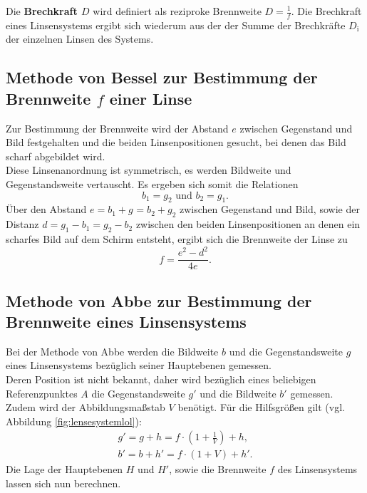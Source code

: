 Die \textbf{Brechkraft $D$} wird definiert als reziproke Brennweite $D=\frac{1}{f}$. Die Brechkraft eines Linsensystems ergibt sich wiederum aus der der Summe der Brechkräfte $D_{\mathrm{i}}$ der einzelnen Linsen des Systems.
\FloatBarrier
\subsection{Methode von Bessel zur Bestimmung der Brennweite $f$ einer Linse}
Zur Bestimmung der Brennweite wird der Abstand $e$ zwischen Gegenstand und Bild festgehalten und die beiden Linsenpositionen gesucht, bei denen das Bild scharf abgebildet wird.\\
Diese Linsenanordnung ist symmetrisch, es werden Bildweite und Gegenstandsweite vertauscht.
Es ergeben sich somit die Relationen
\begin{equation*}
b_{\mathrm{1}}=g_{\mathrm{2}} \text{ und } b_{\mathrm{2}}=g_{\mathrm{1}} \text{.}
\end{equation*}
Über den Abstand $e=b_{\mathrm{1}}+g_{\mathrm{}}=b_{\mathrm{2}}+g_{\mathrm{2}} $ zwischen Gegenstand und Bild, sowie der Distanz $d=g_{\mathrm{1}}-b_{\mathrm{1}}=g_{\mathrm{2}}-b_{\mathrm{2}}$ zwischen den beiden Linsenpositionen an denen ein scharfes Bild auf dem Schirm entsteht,
ergibt sich die Brennweite der Linse zu
\begin{equation}
  \label{eqn:nochmalbessel}
  f=\frac{e^2-d^2}{4e}\text{.}
\end{equation}

\subsection{Methode von Abbe zur Bestimmung der Brennweite eines Linsensystems}
Bei der Methode von Abbe werden die Bildweite $b$ und die Gegenstandsweite $g$ eines Linsensystems bezüglich seiner Hauptebenen gemessen.
\\Deren Position ist nicht bekannt, daher wird bezüglich eines beliebigen Referenzpunktes $A$ die Gegenstandsweite $g'$ und die Bildweite $b'$ gemessen.
\\Zudem wird der Abbildungsmaßstab $V$ benötigt.
Für die Hilfsgrößen gilt (vgl. Abbildung \ref{fig:lensesystemlol}):
\begin{gather}
  \label{eqn:abbe}
  g'=g+h=f\cdot\left(1+\frac{1}{V}\right)+h \text{,}\\
  b'=b+h'=f\cdot\left(1+V\right)+h' \text{.}
\end{gather}
Die Lage der Hauptebenen $H$ und $H'$, sowie die Brennweite $f$ des Linsensystems lassen sich nun berechnen.
